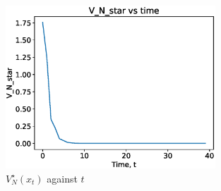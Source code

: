 \documentclass[a4paper,11pt,reqno]{amsart}
\begin{document}
\begin{figure}[H]
    \centering
    \includegraphics[width=0.7\textwidth]{figures/q4_ii.eps}
    \caption{$V^{\star}_{N}(x_t)$ against $t$}
    \label{fig:q5_ii}
\end{figure}
\end{document}
